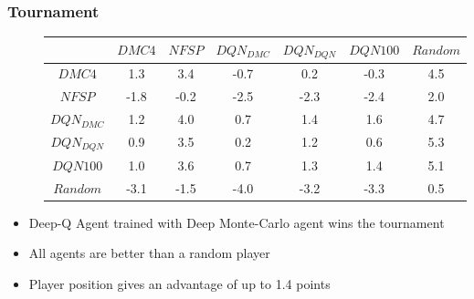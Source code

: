 
\begin{frame}
\frametitle{Tournament}

\begin{figure}
\begin{tabular}{c | c | c | c | c | c | c}
            & $DMC4$  & $NFSP$ & $DQN_{DMC}$ & $DQN_{DQN}$  & $DQN100$ & $Random$ \\
\hline
$DMC4$      & 1.3     & 3.4    & -0.7        & 0.2          & -0.3     & 4.5      \\
\hline
$NFSP$      & -1.8    & -0.2   & -2.5        & -2.3         & -2.4     & 2.0      \\
\hline
$DQN_{DMC}$ & 1.2     & 4.0    & 0.7         & 1.4          & 1.6      & 4.7      \\
\hline
$DQN_{DQN}$ & 0.9     & 3.5    & 0.2         & 1.2          & 0.6      & 5.3      \\
\hline
$DQN100$    & 1.0     & 3.6    & 0.7         & 1.3          & 1.4      & 5.1      \\
\hline
$Random$    & -3.1    & -1.5   & -4.0        & -3.2         & -3.3     & 0.5      \\
\end{tabular}
\end{figure}


\begin{itemize}
\item Deep-Q Agent trained with Deep Monte-Carlo agent wins the tournament
\item All agents are better than a random player
\item Player position gives an advantage of up to 1.4 points
\end{itemize}

\end{frame}